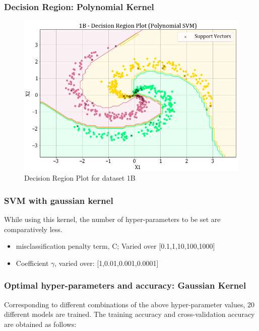 \documentclass[11pt,a4paper]{article}
\newcommand{\noi}{\noindent}
\begin{document}
\subsubsection{Decision Region: Polynomial Kernel}

\begin{figure}[H]
    \centering
    \includegraphics[scale=0.5]{images/1B_SVM_poly_decision_plot.png}
    \caption{Decision Region Plot for dataset 1B}
    \label{myfig:poly_db}
\end{figure}

\subsubsection{SVM with gaussian kernel}\label{section:gaussian}

While using this kernel, the number of hyper-parameters to be set are comparatively less.
\begin{itemize}
    \item misclassification penalty term, C; Varied over [0.1,1,10,100,1000]
    \item Coefficient $\gamma$, varied over: [1,0.01,0.001,0.0001]
\end{itemize}

\subsubsection{Optimal hyper-parameters and accuracy: Gaussian Kernel}

Corresponding to different combinations of the above hyper-parameter values, 20 different models are trained. The training accuracy and cross-validation accuracy are obtained as follows:  
\noi

\end{document}
